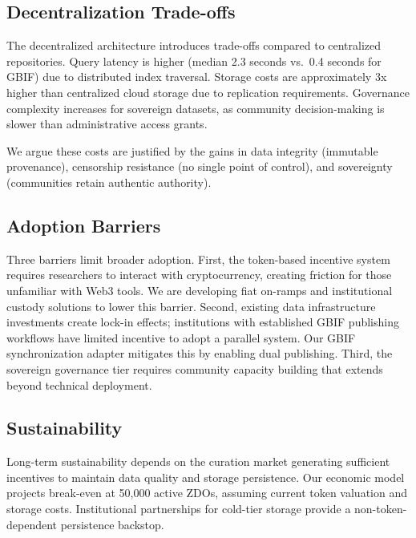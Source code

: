 \documentclass[11pt,a4paper]{article}
\begin{document}
\subsection{Decentralization Trade-offs}

The decentralized architecture introduces trade-offs compared to centralized repositories.
Query latency is higher (median 2.3 seconds vs.\ 0.4 seconds for GBIF) due to distributed index traversal.
Storage costs are approximately 3x higher than centralized cloud storage due to replication requirements.
Governance complexity increases for sovereign datasets, as community decision-making is slower than administrative access grants.

We argue these costs are justified by the gains in data integrity (immutable provenance), censorship resistance (no single point of control), and sovereignty (communities retain authentic authority).

\subsection{Adoption Barriers}

Three barriers limit broader adoption.
First, the token-based incentive system requires researchers to interact with cryptocurrency, creating friction for those unfamiliar with Web3 tools.
We are developing fiat on-ramps and institutional custody solutions to lower this barrier.
Second, existing data infrastructure investments create lock-in effects; institutions with established GBIF publishing workflows have limited incentive to adopt a parallel system.
Our GBIF synchronization adapter mitigates this by enabling dual publishing.
Third, the sovereign governance tier requires community capacity building that extends beyond technical deployment.

\subsection{Sustainability}

Long-term sustainability depends on the curation market generating sufficient incentives to maintain data quality and storage persistence.
Our economic model projects break-even at 50,000 active ZDOs, assuming current token valuation and storage costs.
Institutional partnerships for cold-tier storage provide a non-token-dependent persistence backstop.

\end{document}
